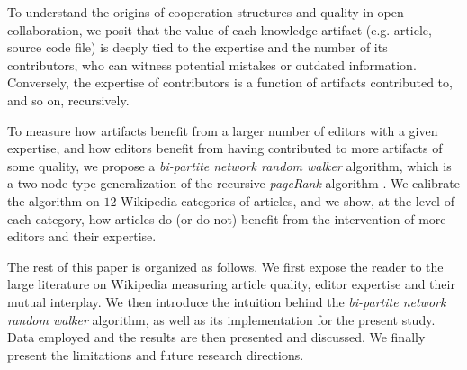 To understand the origins of cooperation structures and quality in open collaboration, we posit that the value of each knowledge artifact (e.g. article, source code file) is deeply tied to the expertise and the number of its contributors, who can witness potential mistakes or outdated information. Conversely, the expertise of contributors is a function of artifacts contributed to, and so on, recursively.

To measure how artifacts benefit from a larger number of editors with a given expertise, and how editors benefit from having contributed to more artifacts of some quality, we propose a {\it bi-partite network random walker} algorithm, which is a two-node type generalization of the recursive {\it pageRank} algorithm \cite{page1999pagerank,kleinberg1999}. We calibrate the algorithm on $12$ Wikipedia categories of articles, and we show, at the level of each category, how articles do (or do not) benefit from the intervention of more editors and their expertise.

The rest of this paper is organized as follows. We first expose the reader to the large literature on Wikipedia measuring article quality, editor expertise and their mutual interplay. We then introduce the intuition behind the {\it bi-partite network random walker} algorithm, as well as its implementation for the present study. Data employed and the results are then presented and discussed. We finally present the limitations and future research directions.
